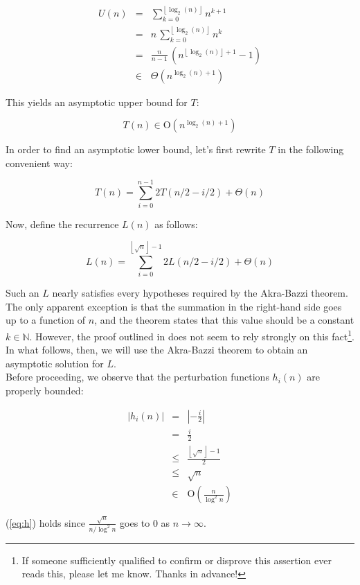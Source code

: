 \documentclass[a4paper,10pt]{article}
\newcommand{\BigO}[1]{\ensuremath{\textrm{O}\left(#1\right)}}
\newcommand{\Nat}{\ensuremath{\mathbb{N}}}
\newcommand{\floor}[1]{\ensuremath{\left\lfloor #1 \right\rfloor}}
\begin{document}
\begin{eqnarray*}
    U(n) &=& \displaystyle \sum_{k = 0}^{\floor{\log_2(n)}}{n^{k+1}} \\
         &=& n \, \displaystyle \sum_{k = 0}^{\floor{\log_2(n)}}{n^k} \\
         &=& \frac{n}{n-1} \, \left(n^{\floor{\log_2(n)} + 1} - 1 \right) \\
         &\in& \Theta \left(n^{\log_2(n) + 1} \right)
\end{eqnarray*}

This yields an asymptotic upper bound for $T$:

\begin{equation}
    T(n) \in \BigO{n^{\log_2(n) + 1}}
\end{equation}

In order to find an asymptotic lower bound, let's first rewrite $T$ in the following convenient way:

\begin{equation*}
    T(n) = \displaystyle \sum_{i = 0}^{n-1}{2T(n/2 - i/2)} + \Theta(n)
\end{equation*} 

Now, define the recurrence $L(n)$ as follows:

\begin{equation*}
    L(n) = \displaystyle \sum_{i = 0}^{\floor{\sqrt{n}} - 1}{2L(n/2 - i/2)} + \Theta(n)
\end{equation*}

Such an $L$ nearly satisfies every hypotheses required by the Akra-Bazzi theorem\cite{AB}. The only apparent exception is that the summation in the right-hand side goes up to a function of $n$, and the theorem states that this value should be a constant $k \in \Nat$. However, the proof outlined in \cite{AB} does not seem to rely strongly on this fact\footnote{If someone sufficiently qualified to confirm or disprove this assertion ever reads this, please let me know. Thanks in advance!}. In what follows, then, we will use the Akra-Bazzi theorem to obtain an asymptotic solution for $L$.\\

Before proceeding, we observe that the perturbation functions $h_i(n)$ are properly bounded:

\begin{eqnarray}
\label{eq:h}
    |h_i(n)| &=& |-\frac{i}{2}| \nonumber \\
             &=& \frac{i}{2} \nonumber \\
             &\leq& \frac{\floor{\sqrt{n}} - 1}{2} \nonumber \\
             &\leq& \sqrt{n} \nonumber \\
             &\in& \BigO{\frac{n}{\log^2{n}}}
\end{eqnarray}

(\ref{eq:h}) holds since $\frac{\sqrt{n}}{n / \log^2{n}}$ goes to $0$ as $n \rightarrow  \infty$.

 

\end{document}
